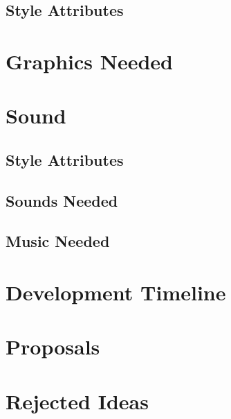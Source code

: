 \documentclass[letterpaper, twoside, 12pt]{memoir}
\begin{document}
\section{Style Attributes}
\chapter{Graphics Needed}

\chapter{Sound}
\section{Style Attributes}
\section{Sounds Needed}
\section{Music Needed}

\chapter{Development Timeline}

\chapter{Proposals}

\chapter{Rejected Ideas}
\end{document}
